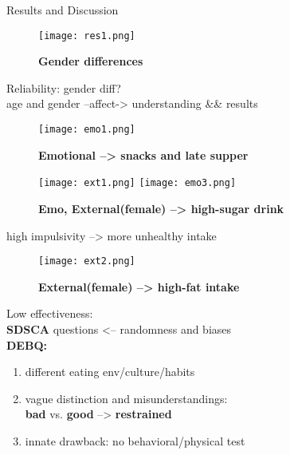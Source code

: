 \documentclass[final]{beamer}
\newlength{\onecolwid}
\begin{document}
\begin{frame}[t]
\begin{columns}[t]
\begin{column}{\onecolwid}
\begin{block}{Results and Discussion}
\begin{figure}[h]
    \caption{\textbf{Gender differences}}
    \centering
    \texttt{[image: res1.png]}
\end{figure}
Reliability: gender diff? \\
age and gender --affect-> understanding \&\& results
\begin{figure}[h]
    \caption{\textbf{Emotional --> snacks and late supper}}
    \centering
    \texttt{[image: emo1.png]}
\end{figure}
\begin{figure}[h]
    \caption{\textbf{Emo, External(female) --> high-sugar drink}}
    \centering
    \texttt{[image: ext1.png]}
    \texttt{[image: emo3.png]}
\end{figure}
high impulsivity --> more unhealthy intake
\begin{figure}[h]
    \caption{\textbf{External(female) --> high-fat intake}}
    \centering
    \texttt{[image: ext2.png]}
\end{figure}
Low effectiveness: \\ 
\textbf{SDSCA} questions <-- randomness and biases \\
\textbf{DEBQ:}
\begin{enumerate}
    \item different eating env/culture/habits
    \item vague distinction and misunderstandings: \\ \textbf{bad} vs. \textbf{good} --> \textbf{restrained}
    \item innate drawback: no behavioral/physical test 
\end{enumerate}

\end{block}







\end{column}
\end{columns}
\end{frame}
\end{document}
